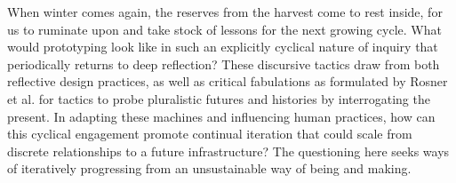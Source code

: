 When winter comes again, the reserves from the harvest come to rest inside, for us to ruminate upon and take stock of lessons for the next growing cycle. What would prototyping look like in such an explicitly cyclical nature of inquiry that periodically returns to deep reflection? 
These discursive tactics draw from both reflective design practices, as well as critical fabulations as formulated by Rosner et al. \cite{sengers_reflective_2005,rosner_critical_2018} for tactics to probe pluralistic futures and histories by interrogating the present. In adapting these machines and influencing human practices, how can this cyclical engagement promote continual iteration that could scale from discrete relationships to a future infrastructure? The questioning here seeks ways of iteratively progressing from an unsustainable way of being and making.

